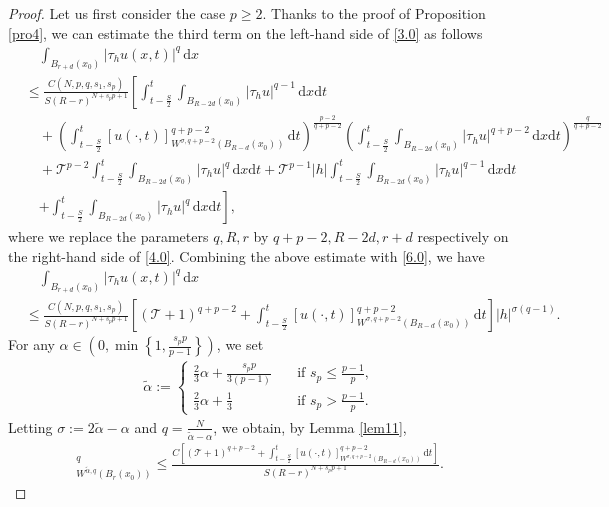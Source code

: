 \documentclass[reqno,10pt]{amsart}
\numberwithin{equation}{section}
\begin{document}
\begin{proof}
	Let us first consider the case $p\ge2$. Thanks to the proof of Proposition \ref{pro4}, we can estimate the third term on the left-hand side of \eqref{3.0} as follows
	\begin{align*}
		&\quad\int_{B_{r+d}(x_0)}|\tau_hu(x,t)|^q\,\mathrm{d}x\\
		&\le\frac{C(N,p,q,s_1,s_p)}{S(R-r)^{N+s_pp+1}}\left[\int_{t-\frac{S}{2}}^{t}\int_{B_{R-2d}(x_0)}|\tau_hu|^{q-1}\,\mathrm{d}x\mathrm{d}t\right.\\
		&\quad+\left( \int_{t-\frac{S}{2}}^{t}[u(\cdot,t)]^{q+p-2}_{W^{\sigma,q+p-2}(B_{R-d}(x_0))}\,\mathrm{d}t\right)^{\frac{p-2}{q+p-2}}\left( \int_{t-\frac{S}{2}}^{t}\int_{B_{R-2d}(x_0)}|\tau_hu|^{q+p-2}\,\mathrm{d}x\mathrm{d}t\right)^\frac{q}{q+p-2}\\
		&\quad+\mathcal{T}^{p-2}\int_{t-\frac{S}{2}}^{t}\int_{B_{R-2d}(x_0)}|\tau_hu|^q\,\mathrm{d}x\mathrm{d}t+\mathcal{T}^{p-1}|h|\int_{t-\frac{S}{2}}^{t}\int_{B_{R-2d}(x_0)}|\tau_hu|^{q-1}\,\mathrm{d}x\mathrm{d}t\\
		&\quad\left.+\int_{t-\frac{S}{2}}^{t}\int_{B_{R-2d}(x_0)}|\tau_hu|^q\,\mathrm{d}x\mathrm{d}t\right],
	\end{align*}
	where we replace the parameters $q, R, r$ by $q+p-2, R-2d, r+d$ respectively on the right-hand side of \eqref{4.0}. Combining the above estimate with \eqref{6.0}, we have
	\begin{align*}
		&\quad\int_{B_{r+d}(x_0)}|\tau_hu(x,t)|^q\,\mathrm{d}x\\
		&\le\frac{C(N,p,q,s_1,s_p)}{S(R-r)^{N+s_pp+1}}\left[ \left( \mathcal{T}+1\right)^{q+p-2}+\int_{t-\frac{S}{2}}^{t}[u(\cdot,t)]^{q+p-2}_{W^{\sigma,q+p-2}(B_{R-d}(x_0))}\,\mathrm{d}t\right]|h|^{\sigma(q-1)}.
	\end{align*}
	For any $\alpha\in\left(0,\min\left\lbrace 1,\frac{s_pp}{p-1}\right\rbrace \right)$, we set
	\begin{align*}
		\tilde{\alpha}:=
		\begin{cases}
			\frac{2}{3}\alpha+\frac{s_pp}{3(p-1)}\quad&\text{if }s_p\le\frac{p-1}{p},\\[2mm]
			\frac{2}{3}\alpha+\frac{1}{3}\quad&\text{if }s_p>\frac{p-1}{p}.
		\end{cases}
	\end{align*}
	Letting $\sigma:=2\tilde{\alpha}-\alpha$ and $q=\frac{N}{\tilde{\alpha}-\alpha}$, we obtain, by Lemma \ref{lem11},
	\begin{align*}
		[u(\cdot,t)]^q_{W^{\tilde{\alpha},q}(B_r(x_0))}\le\frac{C\left[ \left( \mathcal{T}+1\right)^{q+p-2}+\int_{t-\frac{S}{2}}^{t}[u(\cdot,t)]^{q+p-2}_{W^{\sigma,q+p-2}(B_{R-d}(x_0))}\,\mathrm{d}t\right]}{S(R-r)^{N+s_pp+1}}.
	\end{align*}
	

\end{proof}
\end{document}
